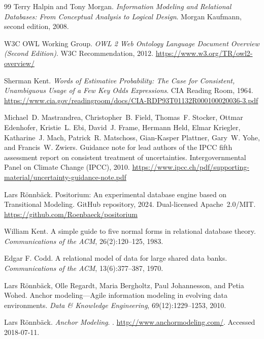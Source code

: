 \documentclass[a4paper,fleqn]{cas-sc}
\begin{document}
\begin{thebibliography}{99}
Terry Halpin and Tony Morgan.
\newblock \emph{Information Modeling and Relational Databases: From Conceptual Analysis to Logical Design}.
\newblock Morgan Kaufmann, second edition, 2008.

W3C OWL Working Group.
\newblock \emph{OWL 2 Web Ontology Language Document Overview (Second Edition)}.
\newblock W3C Recommendation, 2012.
\newblock \url{https://www.w3.org/TR/owl2-overview/}

Sherman Kent.
\newblock \emph{Words of Estimative Probability: The Case for Consistent,
Unambiguous Usage of a Few Key Odds Expressions}.
\newblock CIA Reading Room, 1964.
\newblock \url{https://www.cia.gov/readingroom/docs/CIA-RDP93T01132R000100020036-3.pdf}

Michael~D. Mastrandrea, Christopher~B. Field, Thomas~F. Stocker, Ottmar Edenhofer, Kristie~L. Ebi, David~J. Frame, Hermann Held, Elmar Kriegler, Katharine~J. Mach, Patrick~R. Matschoss, Gian-Kasper Plattner, Gary~W. Yohe, and Francis~W. Zwiers.
\newblock Guidance note for lead authors of the IPCC fifth assessment report on consistent treatment of uncertainties.
\newblock Intergovernmental Panel on Climate Change (IPCC), 2010.
\newblock \url{https://www.ipcc.ch/pdf/supporting-material/uncertainty-guidance-note.pdf}

Lars R{\"o}nnb{\"a}ck.
\newblock Positorium: An experimental database engine based on Transitional Modeling.
\newblock GitHub repository, 2024. Dual-licensed Apache~2.0/MIT.
\newblock \url{https://github.com/Roenbaeck/positorium}

William Kent.
\newblock A simple guide to five normal forms in relational database theory.
\newblock \emph{Communications of the ACM}, 26(2):120--125, 1983.

Edgar F. Codd.
\newblock A relational model of data for large shared data banks.
\newblock \emph{Communications of the ACM}, 13(6):377--387, 1970.

Lars R{\"o}nnb{\"a}ck, Olle Regardt, Maria Bergholtz, Paul Johannesson, and Petia Wohed.
\newblock Anchor modeling---Agile information modeling in evolving data environments.
\newblock \emph{Data \& Knowledge Engineering}, 69(12):1229--1253, 2010.

Lars R{\"o}nnb{\"a}ck.
\newblock \emph{Anchor Modeling}.
. \url{http://www.anchormodeling.com/}. Accessed 2018-07-11.


\end{thebibliography}
\end{document}
